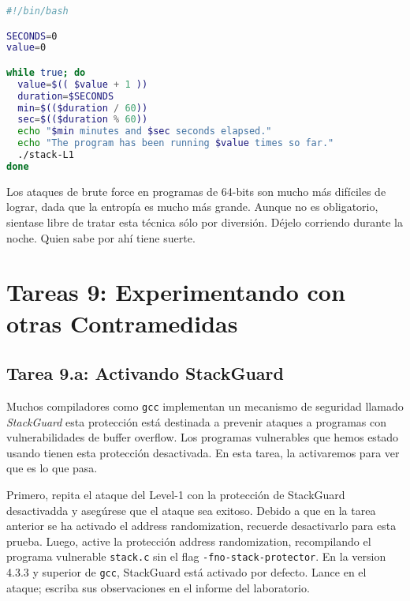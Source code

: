 \begin{lstlisting}[language=bash]
#!/bin/bash

SECONDS=0
value=0

while true; do
  value=$(( $value + 1 ))
  duration=$SECONDS
  min=$(($duration / 60))
  sec=$(($duration % 60))
  echo "$min minutes and $sec seconds elapsed."
  echo "The program has been running $value times so far."
  ./stack-L1
done
\end{lstlisting}

Los ataques de brute force en programas de 64-bits son mucho más difíciles de lograr, dada que la entropía es mucho más grande. Aunque no es obligatorio, sientase libre de tratar esta técnica sólo por diversión.
Déjelo corriendo durante la noche. Quien sabe por ahí tiene suerte.


\section{Tareas 9: Experimentando con otras Contramedidas}


\subsection{Tarea 9.a: Activando StackGuard}

Muchos compiladores como \texttt{gcc} implementan un mecanismo de seguridad llamado \textit{StackGuard} esta protección está destinada a prevenir ataques a programas con vulnerabilidades de buffer overflow. Los programas vulnerables que hemos estado usando tienen esta protección desactivada. 
En esta tarea, la activaremos para ver que es lo que pasa.

Primero, repita el ataque del Level-1 con la protección de StackGuard desactivadda y asegúrese que el ataque sea exitoso. Debido a que en la tarea anterior se ha activado el address randomization, recuerde desactivarlo para esta prueba.
Luego, active la protección address randomization, recompilando el programa vulnerable \texttt{stack.c} sin el flag \texttt{-fno-stack-protector}.
En la version 4.3.3 y superior de \texttt{gcc}, StackGuard está activado por defecto. 
Lance en el ataque; escriba sus observaciones en el informe del laboratorio.



